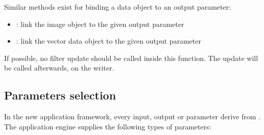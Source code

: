 Similar methods exist for binding a data object to an output parameter:
\begin{itemize}
  \item {} : link the image object to the given output parameter
  \item {} : link the vector data object to the given
  output parameter
\end{itemize}

If possible, no filter update should be called inside this function. The update will be 
called afterwards, on the writer.

\subsection{Parameters selection}
\label{sec:appParam}
In the new application framework, every input, output or parameter derive from 
. The application engine supplies the following 
types of parameters:
